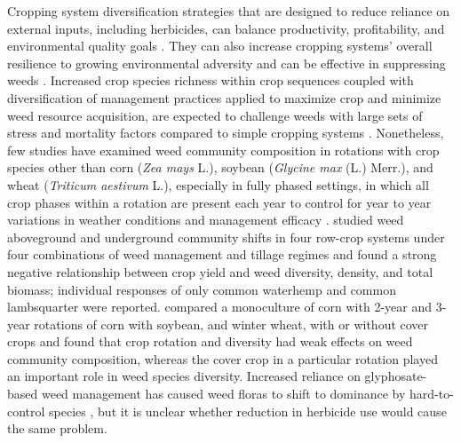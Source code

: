 \documentclass[
]{article}
\begin{document}
Cropping system diversification strategies that are designed to reduce reliance on external inputs, including herbicides, can balance productivity, profitability, and environmental quality goals \citep{davisIncreasingCroppingSystem2012, huntReducingFreshwaterToxicity2017, huntCroppingSystemDiversity2019, huntFossilEnergyUse2020, tamburiniAgriculturalDiversificationPromotes2020, bowlesLongtermEvidenceShows2020, beillouinPositiveVariableEffects2021}. They can also increase cropping systems' overall resilience to growing environmental adversity \citep{bowlesLongtermEvidenceShows2020} and can be effective in suppressing weeds \citep{weisbergerDoesDiversifyingCrop2019}. Increased crop species richness within crop sequences coupled with diversification of management practices applied to maximize crop and minimize weed resource acquisition, are expected to challenge weeds with large sets of stress and mortality factors compared to simple cropping systems \citep{liebmanManyLittleHammers1997, liebmanCropDiversificationWeed2001, westermanAreManyLittle2005}. Nonetheless, few studies have examined weed community composition in rotations with crop species other than corn (\emph{Zea mays} L.), soybean (\emph{Glycine max} (L.) Merr.), and wheat (\emph{Triticum aestivum} L.), especially in fully phased settings, in which all crop phases within a rotation are present each year to control for year to year variations in weather conditions and management efficacy \citep{payneDesignAnalysisLong2015}. \citet{davisWeedSeedbankCommunity2005} studied weed aboveground and underground community shifts in four row-crop systems under four combinations of weed management and tillage regimes and found a strong negative relationship between crop yield and weed diversity, density, and total biomass; individual responses of only common waterhemp and common lambsquarter were reported. \citet{smithAssemblyWeedCommunities2007} compared a monoculture of corn with 2-year and 3-year rotations of corn with soybean, and winter wheat, with or without cover crops and found that crop rotation and diversity had weak effects on weed community composition, whereas the cover crop in a particular rotation played an important role in weed species diversity. Increased reliance on glyphosate-based weed management has caused weed floras to shift to dominance by hard-to-control species \citep{owenWeedSpeciesShifts2008}, but it is unclear whether reduction in herbicide use would cause the same problem.
\end{document}
